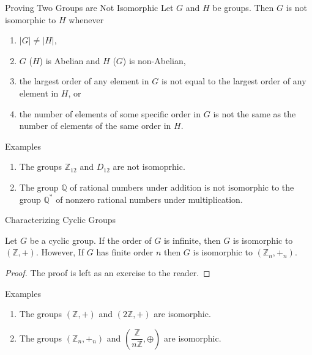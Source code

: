 \documentclass{beamer}
\begin{document}
\begin{frame}{Proving Two Groups are Not Isomorphic}
    \justifying
    Let $G$ and $H$ be groups. Then $G$ is not isomorphic to $H$ whenever
    \begin{enumerate}
        \item $|G| \neq |H|$,
        \item $G$ ($H$) is Abelian and $H$ ($G$) is non-Abelian,
        \item the largest order of any element in $G$ is not equal to the largest order of any element in $H$, or
        \item the number of elements of some specific order in $G$ is not the same as the number of elements of the same order in $H$.
    \end{enumerate}
\end{frame}

\begin{frame}{Examples}
    \justifying
    \begin{enumerate}
        \item The groups $\mathbb{Z}_{12}$ and $D_{12}$ are not isomoprhic.
        \item The group $\mathbb{Q}$ of rational numbers under addition is not isomorphic to the group $\mathbb{Q}^*$ of nonzero rational numbers under multiplication.
    \end{enumerate}
\end{frame}

\begin{frame}{Characterizing Cyclic Groups}
\begin{theorem}
\justifying
Let $G$ be a cyclic group. If the order of $G$ is infinite, then $G$ is isomorphic to $(\mathbb{Z}, +)$. However, If $G$ has finite order $n$ then $G$ is isomorphic to $(\mathbb{Z}_n, +_n)$. 
\end{theorem}
\pause
\begin{proof}
The proof is left as an exercise to the reader.
\end{proof}
\end{frame}

\begin{frame}{Examples}
\begin{enumerate}
\justifying
\item The groups $(\mathbb{Z}, +)$ and $(2\mathbb{Z}, +)$ are isomorphic.
\item The groups $(\mathbb{Z}_n, +_n)$ and $\left(\dfrac{\mathbb{Z}}{n\mathbb{Z}}, \oplus\right)$ are isomorphic.
\end{enumerate}
\end{frame}
\end{document}
